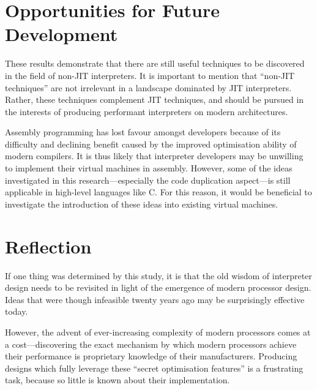 	\section{Opportunities for Future Development}
	These results demonstrate that there are still useful techniques to be discovered in the field of non-JIT interpreters. It is important to mention that ``non-JIT techniques'' are not irrelevant in a landscape dominated by JIT interpreters. Rather, these techniques complement JIT techniques, and should be pursued in the interests of producing performant interpreters on modern architectures.
	
	Assembly programming has lost favour amongst developers because of its difficulty and declining benefit caused by the improved optimisation ability of modern compilers. It is thus likely that interpreter developers may be unwilling to implement their virtual machines in assembly. However, some of the ideas investigated in this research---especially the code duplication aspect---is still applicable in high-level languages like C. For this reason, it would be beneficial to investigate the introduction of these ideas into existing virtual machines.
	
	\section{Reflection}
	If one thing was determined by this study, it is that the old wisdom of interpreter design needs to be revisited in light of the emergence of modern processor design. Ideas that were though infeasible twenty years ago may be surprisingly effective today.
	
	However, the advent of ever-increasing complexity of modern processors comes at a cost---discovering the exact mechanism by which modern processors achieve their performance is proprietary knowledge of their manufacturers. Producing designs which fully leverage these ``secret optimisation features'' is a frustrating task, because so little is known about their implementation.
	
\bibliographysection

